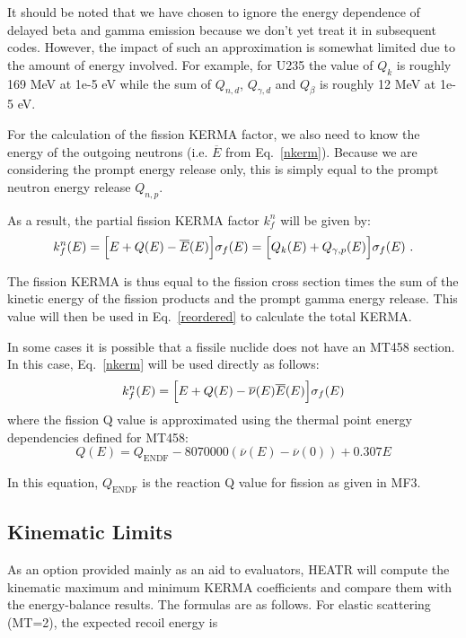 It should be noted that we have chosen to ignore the energy dependence
of delayed beta and gamma emission because we don't yet treat it in
subsequent codes. However, the impact of such an approximation is somewhat
limited due to the amount of energy involved. For example, for U235 the
value of $Q_k$ is roughly 169 MeV at 1e-5 eV while the sum of $Q_{n,d}$,
$Q_{\gamma,d}$ and $Q_{\beta}$ is roughly 12 MeV at 1e-5 eV.

For the calculation of the fission KERMA factor, we also need to know the
energy of the outgoing neutrons (i.e. $\overline{E}$ from Eq.~\ref{nkerm}).
Because we are considering the prompt energy release only, this is simply
equal to the prompt neutron energy release $Q_{n,p}$.

As a result, the partial fission KERMA factor $k_{f}^n$ will be given by:
\begin{equation}
   k_{f}^n(E)=
    \Bigl[E + Q(E) - \overline{E}(E)\Bigr]\sigma_{f}(E)
             =
    \Bigl[Q_k(E) + Q_{\gamma,p}(E)\Bigr]\sigma_{f}(E)\,\,.
\label{fkerm}
\end{equation}

The fission KERMA is thus equal to the fission cross section times the
sum of the kinetic energy of the fission products and the prompt gamma
energy release. This value will then be used in Eq.~\ref{reordered} to
calculate the total KERMA.

In some cases it is possible that a fissile nuclide does not have an
MT458 section. In this case, Eq.~\ref{nkerm} will be used directly as
follows:
\begin{equation}
   k_{f}^n(E)=
    \Bigl[E + Q(E) - \overline{\nu}(E)\overline{E}(E)\Bigr]\sigma_{f}(E)
\label{fkerm-nomt458}
\end{equation}
where the fission Q value is approximated using the thermal point
energy dependencies defined for MT458:
\begin{equation}
   Q(E) = Q_{\text{ENDF}} - 8070000 \left(\overline{\nu}(E)-\overline{\nu}(0)\right) + 0.307 E
\end{equation}

In this equation, $Q_{\text{ENDF}}$ is the reaction Q value for fission
as given in MF3.

\subsection{Kinematic Limits}
\label{ssHEATR_kinematiclimits}

As an option provided  mainly as an aid to evaluators, HEATR
will compute the kinematic maximum and minimum KERMA
 coefficients and compare them with the
energy-balance results.  The formulas are as follows.  For
elastic scattering (MT=2), the expected recoil energy is

